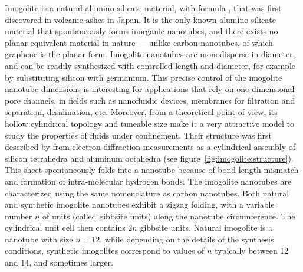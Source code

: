 \documentclass[thesis]{subfiles}
\begin{document}
Imogolite is a natural alumino-silicate material, with formula
, that was first discovered in volcanic ashes in
Japan\cite{Yoshinaga1962}. It is the only known alumino-silicate material that
spontaneously forms inorganic nanotubes, and there exists no planar equivalent
material in nature --- unlike carbon nanotubes, of which graphene is the planar
form. Imogolite nanotubes are monodisperse in diameter, and can be readily
synthesized with controlled length and diameter, for example by substituting
silicon with germanium\cite{Amara2013}. This precise control of the imogolite
nanotube dimensions is interesting for applications that rely on one-dimensional
pore channels, in fields such as nanofluidic devices, membranes for filtration
and separation, desalination, etc. Moreover, from a theoretical point of view,
its hollow cylindrical topology and tuneable size make it a very attractive
model to study the properties of fluids under confinement. Their structure was
first described by \citeauthor{Cradwick1972}\cite{Cradwick1972} from electron
diffraction measurements as a cylindrical assembly of silicon tetrahedra and
aluminum octahedra (see figure~\ref{fig:imogolite:structure}). This sheet
spontaneously folds into a nanotube because of bond length mismatch and
formation of intra-molecular hydrogen bonds\cite{Lee2011,Gonzalez2014}. The
imogolite nanotubes are characterized using the same nomenclature as carbon
nanotubes. Both natural and synthetic imogolite nanotubes exhibit a zigzag
folding, with a variable number $n$ of  units (called
gibbsite units) along the nanotube circumference. The cylindrical unit cell then
contains $2n$ gibbsite units. Natural imogolite is a nanotube with size $n=12$,
while depending on the details of the synthesis conditions, synthetic imogolites
correspond to values of $n$ typically between 12 and 14, and sometimes larger.
\end{document}
